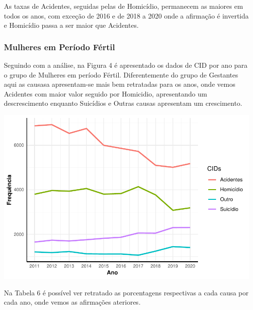 \documentclass[
]{article}
\let\origfigure\figure
\let\endorigfigure\endfigure
\renewenvironment{figure}[1][2] {
    \expandafter\origfigure\expandafter[H]
} {
    \endorigfigure
}
\begin{document}
As taxas de Acidentes, seguidas pelas de Homicídio, permanecem as
maiores em todos os anos, com exceção de 2016 e de 2018 a 2020 onde a
afirmação é invertida e Homicídio passa a ser maior que Acidentes.

\hypertarget{mulheres-em-peruxedodo-fuxe9rtil}{%
\subsubsection{Mulheres em Período
Fértil}\label{mulheres-em-peruxedodo-fuxe9rtil}}

Seguindo com a análise, na Figura 4 é apresentado os dados de CID por
ano para o grupo de Mulheres em período Fértil. Diferentemente do grupo
de Gestantes aqui as causasa apresentam-se mais bem retratadas para os
anos, onde vemos Acidentes com maior valor seguido por Homicidio,
apresentando um descrescimento enquanto Suicídios e Outras causas
apresentam um crescimento.

\begin{figure}
\centering
\includegraphics{RelatorioV02_files/figure-latex/unnamed-chunk-8-1.pdf}
\caption{Frequência de Obitos por CID para Mulheres em Período Fértil}
\end{figure}

Na Tabela 6 é possível ver retratado as porcentagens respectivas a cada
causa por cada ano, onde vemos as afirmações ateriores.
\end{document}

